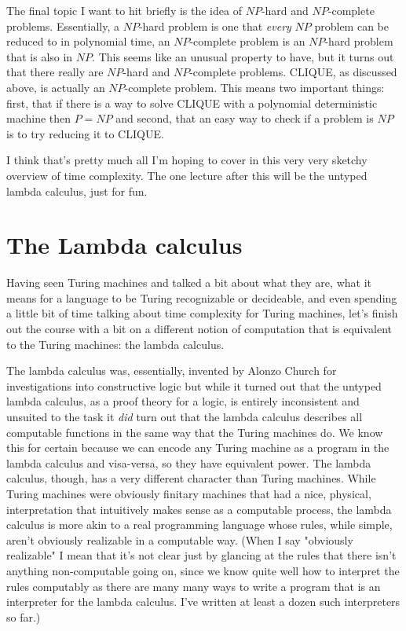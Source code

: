 \documentclass[11pt]{article}
\begin{document}
The final topic I want to hit briefly is the idea of $NP$-hard and $NP$-complete problems. Essentially, a $NP$-hard problem is one that \emph{every} $NP$ problem can be reduced to in polynomial time, an $NP$-complete problem is an $NP$-hard problem that is also in $NP$. This seems like an unusual property to have, but it turns out that there really are $NP$-hard and $NP$-complete problems. CLIQUE, as discussed above, is actually an $NP$-complete problem. This means two important things: first, that if there is a way to solve CLIQUE with a polynomial deterministic machine then $P=NP$ and second, that an easy way to check if a problem is $NP$ is to try reducing it to CLIQUE.

I think that's pretty much all I'm hoping to cover in this very very sketchy overview of time complexity. The one lecture after this will be the untyped lambda calculus, just for fun.
\section{The Lambda calculus}
\label{sec-18}
Having seen Turing machines and talked a bit about what they are, what it means for a language to be Turing recognizable or decideable, and even spending a little bit of time talking about time complexity for Turing machines, let's finish out the course with a bit on a different notion of computation that is equivalent to the Turing machines: the lambda calculus.

The lambda calculus was, essentially, invented by Alonzo Church for investigations into constructive logic but while it turned out that the untyped lambda calculus, as a proof theory for a logic, is entirely inconsistent and unsuited to the task it \emph{did} turn out that the lambda calculus describes all computable functions in the same way that the Turing machines do. We know this for certain because we can encode any Turing machine as a program in the lambda calculus and visa-versa, so they have equivalent power. The lambda calculus, though, has a very different character than Turing machines. While Turing machines were obviously finitary machines that had a nice, physical, interpretation that intuitively makes sense as a computable process, the lambda calculus is more akin to a real programming language whose rules, while simple, aren't obviously realizable in a computable way. (When I say "obviously realizable" I mean that it's not clear just by glancing at the rules that there isn't anything non-computable going on, since we know quite well how to interpret the rules computably as there are many many ways to write a program that is an interpreter for the lambda calculus. I've written at least a dozen such interpreters so far.)
\end{document}
